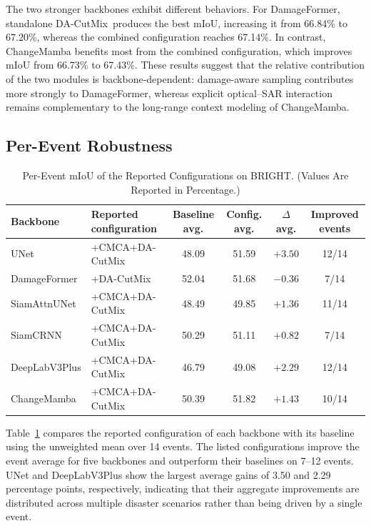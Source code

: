 \documentclass[journal]{IEEEtran}
\newcommand{\cmca}{CMCA}
\newcommand{\dacutmix}{DA-CutMix}
\begin{document}
    The two stronger backbones exhibit different behaviors. For DamageFormer, standalone \dacutmix\ produces the best mIoU, increasing it from 66.84\% to 67.20\%, whereas the combined configuration reaches 67.14\%. In contrast, ChangeMamba benefits most from the combined configuration, which improves mIoU from 66.73\% to 67.43\%. These results suggest that the relative contribution of the two modules is backbone-dependent: damage-aware sampling contributes more strongly to DamageFormer, whereas explicit optical--SAR interaction remains complementary to the long-range context modeling of ChangeMamba.
    
    \subsection{Per-Event Robustness}
    \label{subsec:per_event}
    
    \begin{table}[!t]
    \caption{Per-Event mIoU of the Reported Configurations on BRIGHT. (Values Are Reported in Percentage.)}
    \label{tab:per_event_summary}
    \centering
    \footnotesize
    \setlength{\tabcolsep}{5pt}
    \renewcommand{\arraystretch}{1.05}
    \begin{tabular}{llcccc}
    \toprule
    Backbone & Reported configuration & Baseline avg. & Config. avg. & $\Delta$ avg. & Improved events \\
    \midrule
    UNet & +\cmca+\dacutmix & 48.09 & 51.59 & $+3.50$ & 12/14 \\
    DamageFormer & +\dacutmix & 52.04 & 51.68 & $-0.36$ & 7/14 \\
    SiamAttnUNet & +\cmca+\dacutmix & 48.49 & 49.85 & $+1.36$ & 11/14 \\
    SiamCRNN & +\cmca+\dacutmix & 50.29 & 51.11 & $+0.82$ & 7/14 \\
    DeepLabV3Plus & +\cmca+\dacutmix & 46.79 & 49.08 & $+2.29$ & 12/14 \\
    ChangeMamba & +\cmca+\dacutmix & 50.39 & 51.82 & $+1.43$ & 10/14 \\
    \bottomrule
    \end{tabular}
    \renewcommand{\arraystretch}{1.0}
    \end{table}
    
    Table~\ref{tab:per_event_summary} compares the reported configuration of each backbone with its baseline using the unweighted mean over 14 events. The listed configurations improve the event average for five backbones and outperform their baselines on 7--12 events. UNet and DeepLabV3Plus show the largest average gains of 3.50 and 2.29 percentage points, respectively, indicating that their aggregate improvements are distributed across multiple disaster scenarios rather than being driven by a single event.
    
\end{document}
